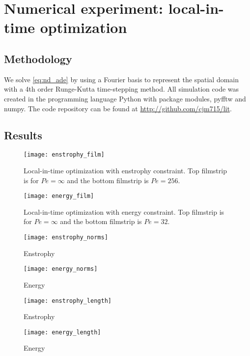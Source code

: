 \documentclass{jfm}
\begin{document}
%
\section{Numerical experiment: local-in-time optimization}
\label{sec:numerical_experiment}
\subsection{Methodology}

We solve \eqref{eq:nd_ade} by using a Fourier basis to represent the spatial domain with a 4th order Runge-Kutta time-stepping method. All simulation code was created in the programming language Python with package modules, pyfftw and numpy. The code repository can be found at \href{http://github.com/cjm715/lit}{ http://github.com/cjm715/lit}.

\subsection{Results}

\begin{figure}
\texttt{[image: enstrophy\_film]}
\caption{Local-in-time optimization with enstrophy constraint. Top filmstrip is for $Pe =\infty$ and the bottom filmstrip is $Pe=256$.}
\label{fig:enstrophy_film}
\end{figure}

\begin{figure}
\texttt{[image: energy\_film]}
\caption{Local-in-time optimization with energy constraint. Top filmstrip is for $Pe = \infty$ and the bottom filmstrip is $Pe=32$.}
\label{fig:energy_film}
\end{figure}

\begin{figure}
\texttt{[image: enstrophy\_norms]}
\caption{Enstrophy}
\label{fig:enstrophy_norms}
\end{figure}
\begin{figure}
\texttt{[image: energy\_norms]}
\caption{Energy}
\label{fig:energy_norms}
\end{figure}
\begin{figure}
\texttt{[image: enstrophy\_length]}
\caption{Enstrophy}
\label{fig:enstrophy_length}
\end{figure}


\begin{figure}
\texttt{[image: energy\_length]}
\caption{Energy}
\label{fig:energy_length}
\end{figure}
\end{document}
